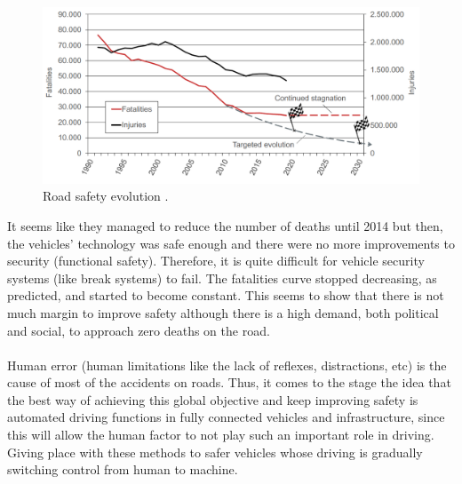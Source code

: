     \begin{figure}[ht] 
    \centering
    \captionsetup{justification=centering}
    \includegraphics[width=\textwidth]{Images/Road_safety_evolution.png}
    \caption[Road safety evolution]{Road safety evolution \parencite{ertrac}.}
    \label{fig:road_safety}
    \vspace{-0.5em}
    \end{figure}
    It seems like they managed to reduce the number of deaths until 2014 but then, the vehicles' technology was safe enough and there were no more improvements to security (functional safety). Therefore, it is quite difficult for vehicle security systems (like break systems) to fail. The fatalities curve stopped decreasing, as predicted, and started to become constant. This seems to show that there is not much margin to improve safety although there is a high demand, both political and social, to approach zero deaths on the road. \\
    \\
    Human error (human limitations like the lack of reflexes, distractions, etc) is the cause of most of the accidents on roads. Thus, it comes to the stage the idea that the best way of achieving this global objective and keep improving safety is automated driving functions in fully connected vehicles and infrastructure, since this will allow the human factor to not play such an important role in driving. Giving place with these methods to safer vehicles whose driving is gradually switching control from human to machine.
    \\
    \\
